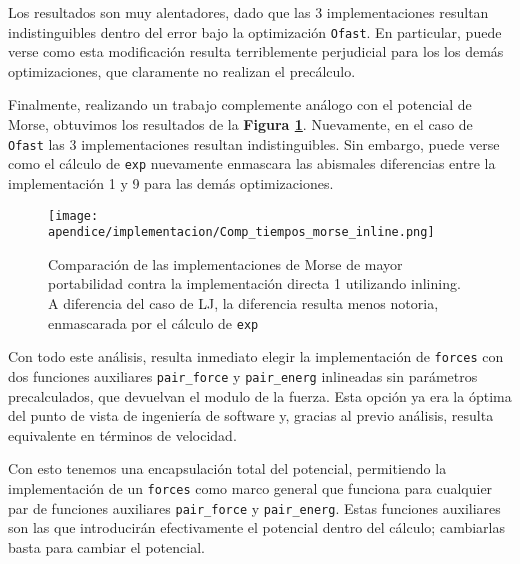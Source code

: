 Los resultados son muy alentadores, dado que las 3 implementaciones resultan indistinguibles dentro del error bajo la optimización \texttt{Ofast}. 
En particular, puede verse como esta modificación resulta terriblemente perjudicial para los los demás optimizaciones, que claramente no realizan el precálculo. 

Finalmente, realizando un trabajo complemente análogo con el potencial de Morse, obtuvimos los resultados de la \textbf{Figura \ref{fig:CompEsp_morse_inline}}. 
Nuevamente, en el caso de \texttt{Ofast} las 3 implementaciones resultan indistinguibles. 
Sin embargo, puede verse como el cálculo de \texttt{exp} nuevamente enmascara las abismales diferencias entre la implementación 1 y 9 para las demás optimizaciones.

\begin{figure}[h]
	\centering
	\texttt{[image: apendice/implementacion/Comp\_tiempos\_morse\_inline.png]}
	\caption{Comparación de las implementaciones de Morse de mayor portabilidad contra la implementación directa 1 utilizando inlining. A diferencia del caso de LJ, la diferencia resulta menos notoria, 
	enmascarada por el cálculo de \texttt{exp}}
	\label{fig:CompEsp_morse_inline}
\end{figure}

Con todo este análisis, resulta inmediato elegir la implementación de \texttt{forces} con dos funciones auxiliares \texttt{pair\_force} y \texttt{pair\_energ} inlineadas sin parámetros precalculados, 
que devuelvan el modulo de la fuerza. Esta opción ya era la óptima del punto de vista de ingeniería de software y, gracias al previo análisis, resulta equivalente en términos de velocidad.

Con esto tenemos una encapsulación total del potencial, permitiendo la implementación de un \texttt{forces} como marco general que funciona para cualquier par de funciones auxiliares \texttt{pair\_force} y 
\texttt{pair\_energ}. 
Estas funciones auxiliares son las que introducirán efectivamente el potencial dentro del cálculo; cambiarlas basta para cambiar el potencial.
